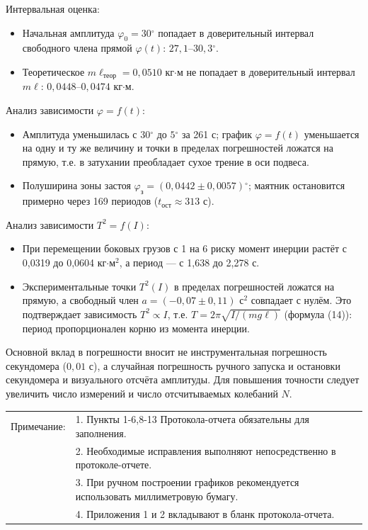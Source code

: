 \documentclass[11pt,a4paper]{article}
\newcommand{\sect}[1]{\par\vspace{10pt}{\large #1}\par\vspace{4pt}}
\newcommand{\gr}{\ensuremath{^\circ}}
\newcommand{\sub}[1]{\text{#1}}
\begin{document}
Интервальная оценка:
\begin{itemize}
  \item Начальная амплитуда $\varphi_0=30\gr$ попадает в доверительный интервал свободного члена прямой $\varphi(t)$: $27,1$–$30,3\gr$.
  \item Теоретическое $m\ell_\sub{теор}=0,0510$ кг$\cdot$м не попадает в доверительный интервал $m\ell$: $0,0448$–$0,0474$ кг$\cdot$м.
\end{itemize}
\sect{13. Выводы и анализ результатов работы.}

Анализ зависимости $\varphi=f(t)$:
\begin{itemize}
  \item Амплитуда уменьшилась с $30\gr$ до $5\gr$ за 261 с; график $\varphi=f(t)$ уменьшается на одну и ту же величину и точки в пределах погрешностей ложатся на прямую, т.е. в затухании преобладает сухое трение в оси подвеса.
  \item Полуширина зоны застоя $\varphi_\sub{з}=(0,0442\pm0,0057)\gr$; маятник остановится примерно через 169 периодов
  ($t_\sub{ост}\approx313$ с).
\end{itemize}

Анализ зависимости $T^2=f(I)$:
\begin{itemize}
  \item При перемещении боковых грузов с 1 на 6 риску момент инерции растёт с 0,0319 до 0,0604 кг$\cdot$м$^2$, а период — с 1,638 до 2,278 с.
  \item Экспериментальные точки $T^2(I)$ в пределах погрешностей ложатся на прямую, а свободный член
  $a=(-0,07\pm0,11)$ с$^2$ совпадает с нулём. Это подтверждает зависимость $T^2\propto I$, т.е. $T=2\pi\sqrt{I/(mg\ell)}$
  (формула (14)): период пропорционален корню из момента инерции.
\end{itemize}

Основной вклад в погрешности вносит не инструментальная погрешность секундомера ($0,01$ с), а случайная
погрешность ручного запуска и остановки секундомера и визуального отсчёта амплитуды. Для повышения точности
следует увеличить число измерений и число отсчитываемых колебаний $N$.

\sect{14. Дополнительные задания.}

\sect{15. Выполнение дополнительных заданий.}

\sect{16. Замечания преподавателя (исправления, вызванные замечаниями преподавателя, также помещают в этот пункт).}

\vspace{1.5cm}

\begin{tabular}{@{}l@{\ }p{14.5cm}@{}}
Примечание: & 1. Пункты 1-6,8-13 Протокола-отчета обязательны для заполнения.\\
 & 2. Необходимые исправления выполняют непосредственно в протоколе-отчете.\\
 & 3. При ручном построении графиков рекомендуется использовать миллиметровую бумагу.\\
 & 4. Приложения 1 и 2 вкладывают в бланк протокола-отчета.\\
\end{tabular}
\end{document}
